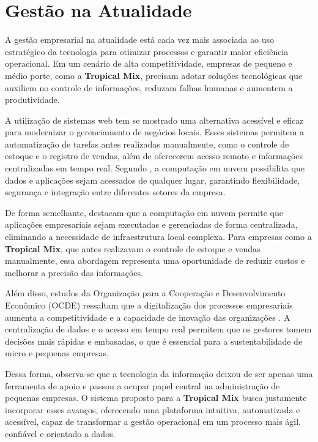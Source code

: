 \section{Gestão na Atualidade}

A gestão empresarial na atualidade está cada vez mais associada ao uso estratégico da tecnologia para otimizar processos e garantir maior eficiência operacional. Em um cenário de alta competitividade, empresas de pequeno e médio porte, como a \textbf{Tropical Mix}, precisam adotar soluções tecnológicas que auxiliem no controle de informações, reduzam falhas humanas e aumentem a produtividade.

A utilização de sistemas web tem se mostrado uma alternativa acessível e eficaz para modernizar o gerenciamento de negócios locais. Esses sistemas permitem a automatização de tarefas antes realizadas manualmente, como o controle de estoque e o registro de vendas, além de oferecerem acesso remoto e informações centralizadas em tempo real. Segundo \cite{mell2011}, a computação em nuvem possibilita que dados e aplicações sejam acessados de qualquer lugar, garantindo flexibilidade, segurança e integração entre diferentes setores da empresa.

De forma semelhante, \cite[p.~2]{armbrust2009} destacam que a computação em nuvem permite que aplicações empresariais sejam executadas e gerenciadas de forma centralizada, eliminando a necessidade de infraestrutura local complexa. Para empresas como a \textbf{Tropical Mix}, que antes realizavam o controle de estoque e vendas manualmente, essa abordagem representa uma oportunidade de reduzir custos e melhorar a precisão das informações.

Além disso, estudos da Organização para a Cooperação e Desenvolvimento Econômico (OCDE) ressaltam que a digitalização dos processos empresariais aumenta a competitividade e a capacidade de inovação das organizações \cite{oecd2014}. A centralização de dados e o acesso em tempo real permitem que os gestores tomem decisões mais rápidas e embasadas, o que é essencial para a sustentabilidade de micro e pequenas empresas.

Dessa forma, observa-se que a tecnologia da informação deixou de ser apenas uma ferramenta de apoio e passou a ocupar papel central na administração de pequenas empresas. O sistema proposto para a \textbf{Tropical Mix} busca justamente incorporar esses avanços, oferecendo uma plataforma intuitiva, automatizada e acessível, capaz de transformar a gestão operacional em um processo mais ágil, confiável e orientado a dados.


